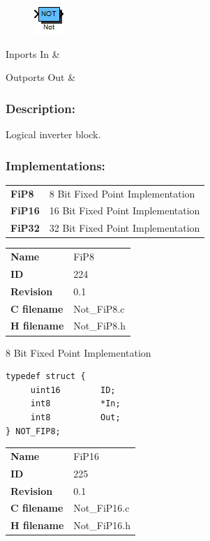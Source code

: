 \label{block:Not}
\begin{figure}[H]\includegraphics{Not}\end{figure} 

\begin{XtoCtabular}{Inports}
In & \tabularnewline
\hline
\end{XtoCtabular}


\begin{XtoCtabular}{Outports}
Out & \tabularnewline
\hline
\end{XtoCtabular}

\subsubsection*{Description:}
Logical inverter block.

\subsubsection*{Implementations:}
\begin{tabular}{l l}
\textbf{FiP8} & 8 Bit Fixed Point Implementation\tabularnewline
\textbf{FiP16} & 16 Bit Fixed Point Implementation\tabularnewline
\textbf{FiP32} & 32 Bit Fixed Point Implementation\tabularnewline
\end{tabular}

\nopagebreak[0]
\begin{tabular}{l l}
\textbf{Name} & FiP8 \tabularnewline
\textbf{ID} & 224 \tabularnewline
\textbf{Revision} & 0.1 \tabularnewline
\textbf{C filename} & Not\_FiP8.c \tabularnewline
\textbf{H filename} & Not\_FiP8.h \tabularnewline
\end{tabular}
\vspace{1ex}

8 Bit Fixed Point Implementation

\begin{lstlisting}
typedef struct {
     uint16        ID;
     int8          *In;
     int8          Out;
} NOT_FIP8;
\end{lstlisting}

\ifdefined \AddTestReports
{}
\fi
{}
\nopagebreak[0]
\begin{tabular}{l l}
\textbf{Name} & FiP16 \tabularnewline
\textbf{ID} & 225 \tabularnewline
\textbf{Revision} & 0.1 \tabularnewline
\textbf{C filename} & Not\_FiP16.c \tabularnewline
\textbf{H filename} & Not\_FiP16.h \tabularnewline
\end{tabular}
\vspace{1ex}

